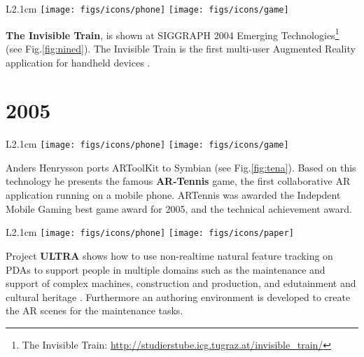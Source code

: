 \documentclass[12pt,a4paper]{article}
\begin{document}
\vspace{0.1in} 

\begin{wrapfigure}{L}{2.1cm}
	\vspace{-10pt}	
	\texttt{[image: figs/icons/phone]}
	\texttt{[image: figs/icons/game]}	
	\vspace{-20pt}		
\end{wrapfigure}
\noindent \textbf{The Invisible Train}, is shown at SIGGRAPH 2004 Emerging Technologies\footnote{The Invisible Train: \url{http://studierstube.icg.tugraz.at/invisible_train/}} (see Fig.\ref{fig:nined}). The Invisible Train is the first multi-user Augmented Reality application for handheld devices \cite{Wagner05}.

\vspace{-5pt}
\section*{2005}

\begin{wrapfigure}{L}{2.1cm}
	\vspace{-15pt}	
	\texttt{[image: figs/icons/phone]}
	\texttt{[image: figs/icons/game]}	
	\vspace{-25pt}		
\end{wrapfigure}
Anders Henrysson ports ARToolKit to Symbian \cite{Henrysson05} (see Fig.\ref{fig:tena}). Based on this technology he presents the famous \textbf{AR-Tennis} game, the first collaborative AR application running on a mobile phone. ARTennis was awarded the Indepdent Mobile Gaming best game award for 2005, and the technical achievement award.

\vspace{0.1in}

\begin{wrapfigure}{L}{2.1cm}
	\vspace{-15pt}	
	\texttt{[image: figs/icons/phone]}
	\texttt{[image: figs/icons/paper]}	
	\vspace{-25pt}		
\end{wrapfigure}
\noindent Project \textbf{ULTRA} shows how to use non-realtime natural feature tracking on PDAs to support people in multiple domains such as the maintenance and support of complex machines, construction and production, and edutainment and cultural heritage \cite{Makri05}. Furthermore an authoring environment is developed to create the AR scenes for the maintenance tasks.
\end{document}
